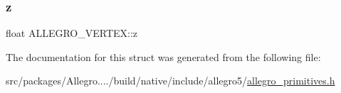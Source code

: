 \mbox{\label{struct_a_l_l_e_g_r_o___v_e_r_t_e_x_a206b126f2ab8cf9ce022b72cb27b6921}} 
\subsubsection{\texorpdfstring{z}{z}}
{\footnotesize\ttfamily float A\+L\+L\+E\+G\+R\+O\+\_\+\+V\+E\+R\+T\+E\+X\+::z}



The documentation for this struct was generated from the following file\+:\begin{DoxyCompactItemize}
\item 
src/packages/\+Allegro..../build/native/include/allegro5/\hyperlink{allegro__primitives_8h}{allegro\+\_\+primitives.\+h}\end{DoxyCompactItemize}
